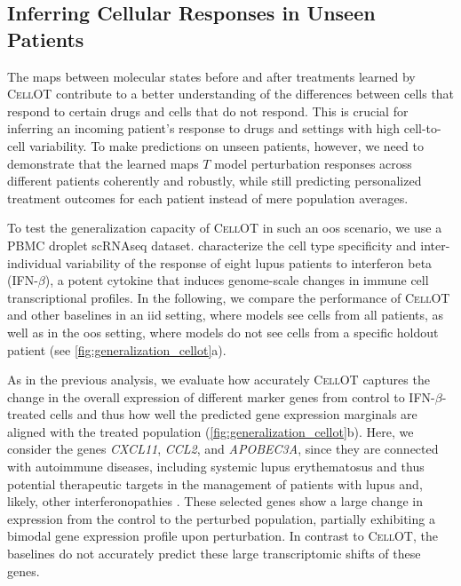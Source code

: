 \subsection{Inferring Cellular Responses in Unseen Patients}
The maps between molecular states before and after treatments learned by \textsc{CellOT} contribute to a better understanding of the differences between cells that respond to certain drugs and cells that do not respond. This is crucial for inferring an incoming patient's response to drugs and settings with high cell-to-cell variability.
To make predictions on unseen patients, however, we need to demonstrate that the learned maps $T$ model perturbation responses across different patients coherently and robustly, while still predicting personalized treatment outcomes for each patient instead of mere population averages.

To test the generalization capacity of \textsc{CellOT} in such an \acrfull{oos} scenario, we use a \acrfull{PBMC} droplet \acrshort{sc}\acrshort{RNAseq} dataset. \citet{kang2018multiplexed} characterize the cell type specificity and inter-individual variability of the response of eight lupus patients to interferon beta (IFN-$\beta$), a potent cytokine that induces genome-scale changes in immune cell transcriptional profiles. 
In the following, we compare the performance of \textsc{CellOT} and other baselines in an \acrfull{iid} setting, where models see cells from all patients, as well as in the \acrlong{oos} setting, where models do not see cells from a specific holdout patient (see \cref{fig:generalization_cellot}a).
    
As in the previous analysis, we evaluate how accurately \textsc{CellOT} captures the change in the overall expression of different marker genes from control to IFN-$\beta$-treated cells and thus how well the predicted gene expression marginals are aligned with the treated population (\cref{fig:generalization_cellot}b). Here, we consider the genes \textit{CXCL11}, \textit{CCL2}, and \textit{APOBEC3A},
since they are connected with autoimmune diseases, including systemic lupus erythematosus \citep{hedrich2011epigenetic, perez2021sustained}
and thus potential therapeutic targets
in the management of patients with lupus and, likely, other interferonopathies \citep{mathian2015targeting,rani1996characterization,hedrich2011epigenetic,mathian2015targeting,perez2021sustained,flier2001differential}.
These selected genes show a large change in expression from the control to the perturbed population, partially exhibiting a bimodal gene expression profile upon perturbation. In contrast to \textsc{CellOT}, the baselines do not accurately predict these large transcriptomic shifts of these genes.

